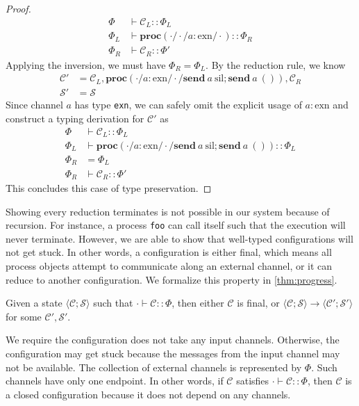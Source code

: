 \documentclass[12pt, openany]{memoir}
\newcommand*{\send}[2]{\textbf{send}\ #1\ #2}
\newcommand*{\procObj}[4]{\textbf{proc}(#1/#2/#3/#4)}
\newcommand*{\config}[0]{\mathcal{C}}
\newcommand*{\cancelSet}[0]{\mathcal{S}}
\begin{document}
\begin{proof}
\begin{align*}
    \Phi & \vdash \config_L :: \Phi_L \\
    \Phi_L & \vdash \procObj{\cdot}{\cdot}{a : \text{exn}}{\cdot} :: \Phi_R \\
    \Phi_R & \vdash \config_R :: \Phi'
  \end{align*}
  Applying the inversion, we must have $\Phi_R = \Phi_L$. By the reduction rule, we know
  \begin{align*}
    \config' &= \config_L, \procObj{\cdot}{a : \text{exn}}{\cdot}{\send{a}{\text{sil}}; \send{a}{()}}, \config_R \\
    \cancelSet' &= \cancelSet
  \end{align*}
  Since channel $a$ has type \texttt{exn}, we can safely omit the explicit usage of $a : \text{exn}$ and 
  construct a typing derivation for $\config'$ as
  \begin{align*}
    \Phi & \vdash \config_L :: \Phi_L \\
    \Phi_L & \vdash \procObj{\cdot}{a : \text{exn}}{\cdot}{\send{a}{\text{sil}}; \send{a}{()}} :: \Phi_L \\
    \Phi_R & = \Phi_L \\
    \Phi_R & \vdash \config_R :: \Phi'
  \end{align*}
  This concludes this case of type preservation.
\end{proof}
Showing every reduction terminates is not possible in our system because of recursion. 
For instance, a process \texttt{foo} can call itself such that the execution will never terminate.
However, we are able to show that well-typed configurations will not get stuck.
In other words, a configuration is either final, which means all process objects attempt to communicate along an external channel,
or it can reduce to another configuration. We formalize this property in \cref{thm:progress}.
\begin{theorem}\label{thm:progress}
  Given a state $\langle \config; \cancelSet \rangle$ such that $\cdot \vdash \config :: \Phi$, then either $\config$ is final, or 
  $\langle \config; \cancelSet \rangle \longrightarrow \langle \config'; \cancelSet' \rangle$ for some $\config', \cancelSet'$.
\end{theorem}
We require the configuration does not take any input channels. 
Otherwise, the configuration may get stuck because the messages from the input channel may not be available.
The collection of external channels is represented by $\Phi$. Such channels have only one endpoint.
In other words, if $\config$ satisfies $\cdot \vdash \config :: \Phi$, then $\config$ is a closed configuration because it does not depend on any channels.
\end{document}

